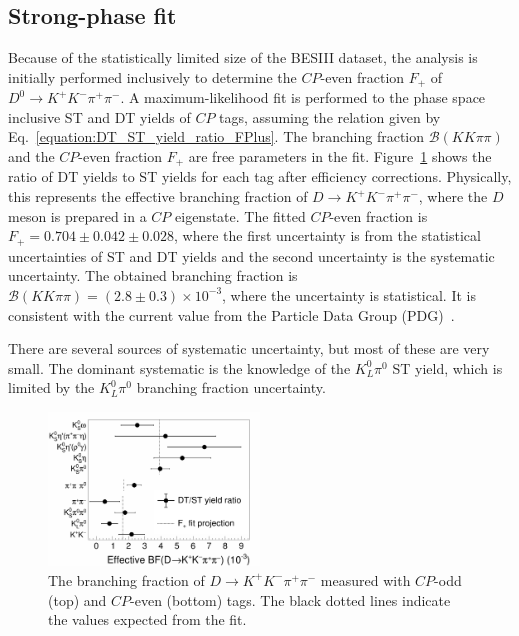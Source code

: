 \documentclass[12pt, a4paper, notitlepage, onecolumn]{article}
\begin{document}
\subsection{Strong-phase fit}
\noindent Because of the statistically limited size of the BESIII dataset, the analysis is initially performed inclusively to determine the $C\!P$-even fraction $F_+$ of $D^0\to K^+K^-\pi^+\pi^-$. A maximum-likelihood fit is performed to the phase space inclusive ST and DT yields of $C\!P$ tags, assuming the relation given by Eq.~\eqref{equation:DT_ST_yield_ratio_FPlus}. The branching fraction $\mathcal{B}(KK\pi\pi)$ and the $C\!P$-even fraction $F_+$ are free parameters in the fit. Figure~\ref{figure:FPlus_CP_tags} shows the ratio of DT yields to ST yields for each tag after efficiency corrections. Physically, this represents the effective branching fraction of $D\to K^+K^-\pi^+\pi^-$, where the $D$ meson is prepared in a $C\!P$ eigenstate. The fitted $C\!P$-even fraction is $F_+ = 0.704 \pm 0.042 \pm 0.028$, where the first uncertainty is from the statistical uncertainties of ST and DT yields and the second uncertainty is the systematic uncertainty. The obtained branching fraction is $\mathcal{B}(KK\pi\pi) = (2.8 \pm 0.3)\times 10^{-3}$, where the uncertainty is statistical. It is consistent with the current value from the Particle Data Group (PDG)~\cite{pdg}.

There are several sources of systematic uncertainty, but most of these are very small. The dominant systematic is the knowledge of the $K^0_L\pi^0$ ST yield, which is limited by the $K^0_L\pi^0$ branching fraction uncertainty.

\begin{figure}[htb]
    \centering
    \includegraphics[width=0.5\textwidth]{Plots/CPeven_fraction_combination_CPtags.png}
    \caption{The branching fraction of $D\to K^+K^-\pi^+\pi^-$ measured with $C\!P$-odd (top) and $C\!P$-even (bottom) tags. The black dotted lines indicate the values expected from the fit.}
    \label{figure:FPlus_CP_tags}
\end{figure}
\end{document}
